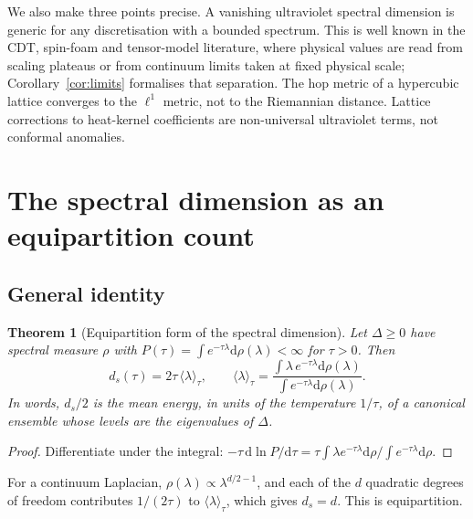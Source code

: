 \documentclass[11pt]{article}
\newtheorem{theorem}{Theorem}
\theoremstyle{remark}\newtheorem*{remark}{Remark}
\newcommand{\dd}{\mathrm{d}}
\begin{document}
We also make three points precise. A vanishing ultraviolet spectral dimension is generic for any
discretisation with a bounded spectrum. This is well known in the CDT, spin-foam and tensor-model literature,
where physical values are read from scaling plateaus or from continuum limits taken at fixed physical scale;
Corollary~\ref{cor:limits} formalises that separation. The hop metric of a hypercubic lattice converges to the
$\ell^1$ metric, not to the Riemannian distance. Lattice corrections
to heat-kernel coefficients are non-universal ultraviolet terms, not conformal anomalies.

\section{The spectral dimension as an equipartition count}
\label{sec:equi}

\subsection{General identity}
\begin{theorem}[Equipartition form of the spectral dimension]
\label{thm:equi}
Let $\Delta\ge0$ have spectral measure $\rho$ with $P(\tau)=\int e^{-\tau\lambda}\dd\rho(\lambda)<\infty$ for $\tau>0$. Then
\begin{equation}
d_s(\tau)=2\tau\,\langle\lambda\rangle_\tau,\qquad
\langle\lambda\rangle_\tau=\frac{\int\lambda\,e^{-\tau\lambda}\dd\rho(\lambda)}{\int e^{-\tau\lambda}\dd\rho(\lambda)} .
\label{eq:equi}
\end{equation}
In words, $d_s/2$ is the mean energy, in units of the temperature $1/\tau$, of a canonical ensemble whose levels
are the eigenvalues of $\Delta$.
\end{theorem}
\begin{proof}
Differentiate under the integral: $-\tau\,\dd\ln P/\dd\tau=\tau\int\lambda e^{-\tau\lambda}\dd\rho/\int e^{-\tau\lambda}\dd\rho$.
\end{proof}
For a continuum Laplacian, $\rho(\lambda)\propto\lambda^{d/2-1}$, and each of the $d$ quadratic degrees of freedom contributes
$1/(2\tau)$ to $\langle\lambda\rangle_\tau$, which gives $d_s=d$. This is equipartition.
\end{document}
